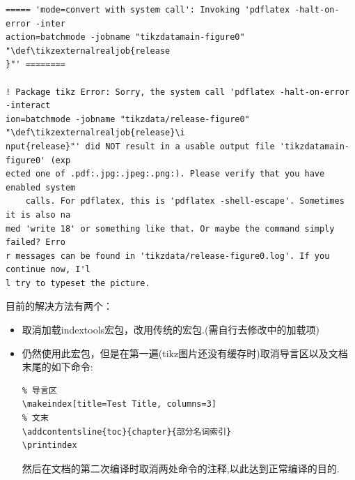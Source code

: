\begin{verbatim}
===== 'mode=convert with system call': Invoking 'pdflatex -halt-on-error -inter
action=batchmode -jobname "tikzdatamain-figure0" "\def\tikzexternalrealjob{release
}"' ========

! Package tikz Error: Sorry, the system call 'pdflatex -halt-on-error -interact
ion=batchmode -jobname "tikzdata/release-figure0" "\def\tikzexternalrealjob{release}\i
nput{release}"' did NOT result in a usable output file 'tikzdatamain-figure0' (exp
ected one of .pdf:.jpg:.jpeg:.png:). Please verify that you have enabled system
    calls. For pdflatex, this is 'pdflatex -shell-escape'. Sometimes it is also na
med 'write 18' or something like that. Or maybe the command simply failed? Erro
r messages can be found in 'tikzdata/release-figure0.log'. If you continue now, I'l
l try to typeset the picture.
\end{verbatim}


目前的解决方法有两个：
\begin{itemize}
    \item 取消加载indextools宏包，改用传统的宏包.(需自行去修改中的加载项)
    \item 仍然使用此宏包，但是在第一遍(tikz图片还没有缓存时)取消导言区以及文档末尾的如下命令:
  \begin{verbatim}
% 导言区
\makeindex[title=Test Title, columns=3]
% 文末
\addcontentsline{toc}{chapter}{部分名词索引}
\printindex
  \end{verbatim}
  然后在文档的第二次编译时取消两处命令的注释,以此达到正常编译的目的.
\end{itemize}
